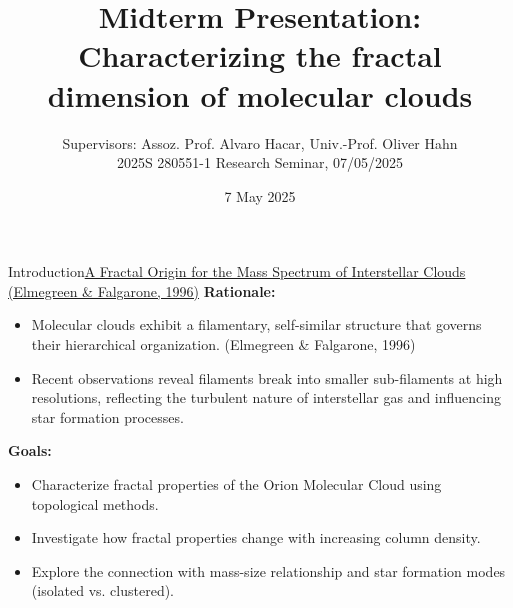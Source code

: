 \documentclass[hyperref={pdfpagelabels=false}, aspectratio=169, t]{beamer}  %
\title{Midterm Presentation: \\ Characterizing the fractal dimension of molecular clouds}											%
\subtitle{Supervisors: Assoz. Prof. Alvaro Hacar, Univ.-Prof. Oliver Hahn \\ 2025S 280551-1 Research Seminar, 07/05/2025}                   					%
\date{7 May 2025}              									%
\begin{document}

\maketitle
											
													





\begin{textFrame}{Introduction}{}{\href{https://ui.adsabs.harvard.edu/abs/1996ApJ...471..816E/abstract}{A Fractal Origin for the Mass Spectrum of Interstellar Clouds (Elmegreen \& Falgarone, 1996)}}
	\textbf{Rationale:}
	\begin{itemize}
		\item Molecular clouds exhibit a filamentary, self-similar structure that governs their hierarchical organization. (Elmegreen \& Falgarone, 1996)
		\item Recent observations reveal filaments break into smaller sub-filaments at high resolutions, reflecting the turbulent nature of interstellar gas and influencing star formation processes.
	\end{itemize}
	\textbf{Goals:}
	\begin{itemize}
		\item Characterize fractal properties of the Orion Molecular Cloud using topological methods.
		\item Investigate how fractal properties change with increasing column density.
		\item Explore the connection with mass-size relationship and star formation modes (isolated vs. clustered).
	\end{itemize}
\end{textFrame}

\end{document}
